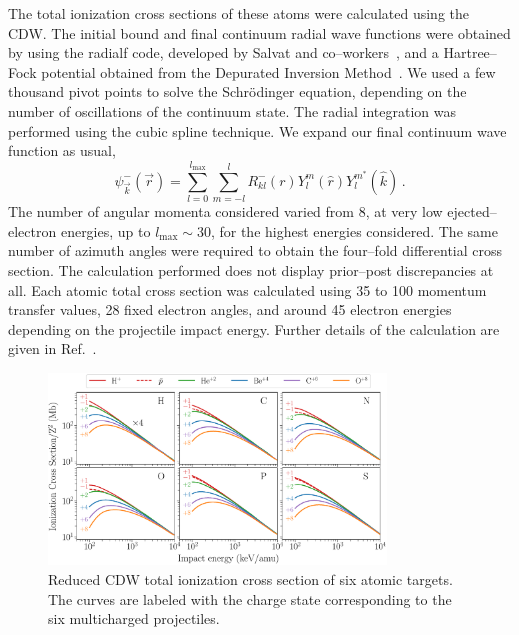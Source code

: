 \documentclass[10pt,showpacs,twocolumn]{revtex4}
\begin{document}
The total ionization cross sections of these atoms were calculated using 
the CDW. The initial bound and final continuum radial wave 
functions were obtained by using the {\sc radialf} code, developed by 
Salvat and co--workers~\cite{salvat1995}, and a Hartree--Fock potential 
obtained from the Depurated Inversion Method~\cite{mendez2016,mendez2018}. 
We used a few thousand pivot points to solve the Schr\"{o}dinger 
equation, depending on the number of oscillations of the continuum 
state. The radial integration was performed using the cubic spline 
technique. We expand our final continuum wave function as usual,
\begin{equation}
\psi_{\overrightarrow{k}}^{-}(\overrightarrow{r})=\sum_{l=0}^{l_{\max
}}\sum_{m=-l}^{l}R_{kl}^{-}(r)Y_{l}^{m}(\widehat{r})Y_{l}^{m^{\ast }}
(\widehat{k})\,.
\label{eq:contwave}
\end{equation}
The number of angular momenta considered varied from 8, at 
very low ejected--electron energies, up to $l_{\max}\sim 30$, 
for the highest energies 
considered. The same number of azimuth angles were required to obtain 
the four--fold differential cross section. The calculation performed does 
not display prior--post discrepancies at all. Each atomic total cross 
section was calculated using 35 to 100 momentum transfer values, 28 
fixed electron angles, and around 45 electron energies depending on the 
projectile impact energy. 
Further details of the calculation are given in Ref.~\cite{montanari2017}. 

\begin{figure}[t!]
\centering
\includegraphics[width=0.8\textwidth]{figuras/atomicscaling.eps}
\caption{Reduced CDW total ionization cross section of six atomic 
targets. The curves are labeled with the charge state corresponding to 
the six multicharged projectiles.}
\label{fig:atomscaling}
\end{figure} 
\end{document}
